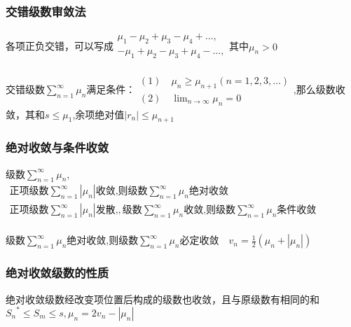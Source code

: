 \documentclass[UTF8]{ctexart}
\newcommand{\mt}[1]{\text{#1}}
\newcommand{\mda}[1]{$\displaystyle{ #1 }$}
\newcommand{\mf}[1]{\left( #1\right)}
\newcommand{\mfa}[1]{\left| #1\right|}
\newcommand{\q}{\quad}
\newcommand{\ma}[1]{\begin{array}{llll} #1 \end{array}}
\begin{document}
\subsubsection{交错级数审敛法}

各项正负交错，可以写成\mda{\ma{\mu_1 -\mu_2  +\mu_3  -\mu_4 +\dots,\\
-\mu_1 +\mu_2  -\mu_3  +\mu_4 -\dots,\\
}}其中\mda{\mu_n>0}


交错级数\mda{\sum_{n=1}^\infty\mu_n}满足条件：\mda{\ma{
    (1) \q  \mu_n \geqslant \mu_{n+1} \mf{n=1,2,3,\dots}\\
    (2) \q  \lim_{n \rightarrow \infty}\mu_n=0}
},那么级数收敛，其和\mda{s\leqslant \mu_1},余项绝对值\mda{\mfa{r_n}\leqslant \mu_{n+1}}


\subsubsection{绝对收敛与条件收敛}


级数\mda{\sum_{n=1}^\infty\mu_n}, \mda{\ma{
   \mt{正项级数} \sum_{n=1}^\infty \mfa{\mu_n} \mt{收敛,则级数} \sum_{n=1}^\infty\mu_n \mt{绝对收敛}\\
   \mt{正项级数} \sum_{n=1}^\infty \mfa{\mu_n} \mt{发散,},\mt{级数} \sum_{n=1}^\infty \mu_n \mt{收敛,则级数} \sum_{n=1}^\infty\mu_n \mt{条件收敛}\\
}}

$\mt{级数} \sum_{n=1}^\infty  \mu_n \mt{绝对收敛,则级数} \sum_{n=1}^\infty\mu_n \mt{必定收敛} \q v_n=\frac{1}{2}\mf{\mu_n+\mfa{\mu_n}}$


\subsubsection{绝对收敛级数的性质}

绝对收敛级数经改变项位置后构成的级数也收敛，且与原级数有相同的和${S_n}^*\leqslant S_m \leqslant s,\mu_n=2v_n-\mfa{\mu_n}$
\end{document}
